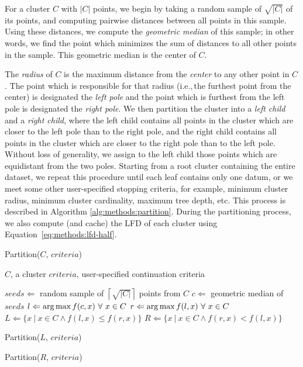 For a cluster $C$ with $|C|$ points, we begin by taking a random sample of $\sqrt{|C|}$ of its points, and computing pairwise distances between all points in this sample.
Using these distances, we compute the \textit{geometric median} of this sample; in other words, we find the point which minimizes the sum of distances to all other points in the sample.
This geometric median is the center of $C$.

The \textit{radius} of $C$ is the maximum distance from the \textit{center} to any other point in $C$.
The point which is responsible for that radius (i.e.,\,the furthest point from the center) is designated the \textit{left pole} and the point which is furthest from the left pole is designated the \textit{right pole}.
We then partition the cluster into a \textit{left child} and a \textit{right child}, where the left child contains all points in the cluster which are closer to the left pole than to the right pole, and the right child contains all points in the cluster which are closer to the right pole than to the left pole.
Without loss of generality, we assign to the left child those points which are equidistant from the two poles.
Starting from a root cluster containing the entire dataset, we repeat this procedure until each leaf contains only one datum, or we meet some other user-specified stopping criteria, for example, minimum cluster radius, minimum cluster cardinality, maximum tree depth, etc.
This process is described in Algorithm \ref{alg:methods:partition}.
During the partitioning process, we also compute (and cache) the LFD of each cluster using Equation~\ref{eq:methods:lfd-half}.

\begin{algorithm} %
    \caption{Partition($C$, $criteria$)} %
    \label{alg:methods:partition} %
    \begin{algorithmic}[0] %
        \Require $C$, a cluster
        \Require $criteria$, user-specified continuation criteria

        \State $seeds \Leftarrow$ random sample of $\left\lceil \sqrt{|C|} \right\rceil$ points from $C$
        \State $c \Leftarrow$ geometric median of $seeds$
        \State $l \Leftarrow \operatorname*{arg\,max} f(c, x) \ \forall \ x \in C$
        \State $r \Leftarrow \argmax f(l, x) \ \forall \ x \in C$
        \State $L \Leftarrow \{x \ | \ x \in C \land f(l, x) \le f(r, x)\}$
        \State $R \Leftarrow \{x \ | \ x \in C \land f(r, x) < f(l, x)\}$

            \State Partition($L$, $criteria$)
        \EndIf

            \State Partition($R$, $criteria$)
        \EndIf
    \end{algorithmic}
\end{algorithm}

